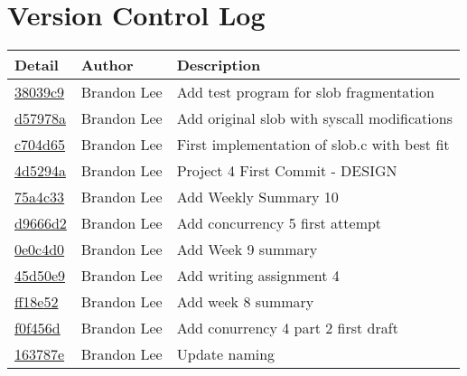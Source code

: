 \documentclass[letterpaper,10pt,titlepage]{article}
\begin{document}
\section{Version Control Log}

\begin{tabular}{l l l}\textbf{Detail} & \textbf{Author} & \textbf{Description}\\\hline
\href{https://github.com/brandonlee503/Operating-Systems-II/commit/38039c99bf96bbe6f6eb588ac4ae111e490afc20}{38039c9} & Brandon Lee & Add test program for slob fragmentation\\\hline
\href{https://github.com/brandonlee503/Operating-Systems-II/commit/d57978af54e1cf498d8dfc137ffe7c47950d14f5}{d57978a} & Brandon Lee & Add original slob with syscall modifications\\\hline
\href{https://github.com/brandonlee503/Operating-Systems-II/commit/c704d654960d0ea3512f303108dd13570e327cd0}{c704d65} & Brandon Lee & First implementation of slob.c with best fit\\\hline
\href{https://github.com/brandonlee503/Operating-Systems-II/commit/4d5294aeeb4c78dc71d3e777e28d6c9ff3908a42}{4d5294a} & Brandon Lee & Project 4 First Commit - DESIGN\\\hline
\href{https://github.com/brandonlee503/Operating-Systems-II/commit/75a4c33496565e62949e348b5e6cc163ed53f632}{75a4c33} & Brandon Lee & Add Weekly Summary 10\\\hline
\href{https://github.com/brandonlee503/Operating-Systems-II/commit/d9666d24606210bc67187245863e09263d6f27e2}{d9666d2} & Brandon Lee & Add concurrency 5 first attempt\\\hline
\href{https://github.com/brandonlee503/Operating-Systems-II/commit/0e0c4d0a6f6e759a0fc6ca9f6b81b6588fc5f4d8}{0e0c4d0} & Brandon Lee & Add Week 9 summary\\\hline
\href{https://github.com/brandonlee503/Operating-Systems-II/commit/45d50e9850f0b3d04f2665eb05c5908863bb9685}{45d50e9} & Brandon Lee & Add writing assignment 4\\\hline
\href{https://github.com/brandonlee503/Operating-Systems-II/commit/ff18e5206d67769b6957f07061d5c93caaaa4b08}{ff18e52} & Brandon Lee & Add week 8 summary\\\hline
\href{https://github.com/brandonlee503/Operating-Systems-II/commit/f0f456da83173a7bf659905fd93cb92667f95b19}{f0f456d} & Brandon Lee & Add conurrency 4 part 2 first draft\\\hline
\href{https://github.com/brandonlee503/Operating-Systems-II/commit/163787e5041a38ce540920ec3a33d54cee131f8b}{163787e} & Brandon Lee & Update naming\\\hline

\end{tabular}
\end{document}
